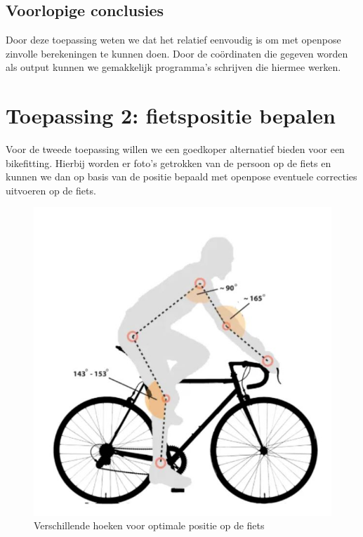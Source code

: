 \documentclass[a4paper,twoside,kulak]{kulakreport}
\begin{document}
\subsection{Voorlopige conclusies}
Door deze  toepassing weten we dat het relatief eenvoudig is om met openpose zinvolle berekeningen te kunnen doen. Door de coördinaten die gegeven worden als output kunnen we gemakkelijk programma's schrijven die hiermee werken.


\section{Toepassing 2: fietspositie bepalen}
Voor de tweede toepassing willen we een goedkoper alternatief bieden voor een bikefitting. Hierbij worden er foto's getrokken van de persoon op de fiets en kunnen we dan op basis van de positie bepaald met openpose eventuele correcties uitvoeren op de fiets.

\begin{figure}[H]
	\centering
	\includegraphics[width=\textwidth]{bikefit}
	\caption{Verschillende hoeken voor optimale positie op de fiets}
	\label{fig:bikefit}
\end{figure}
\end{document}
